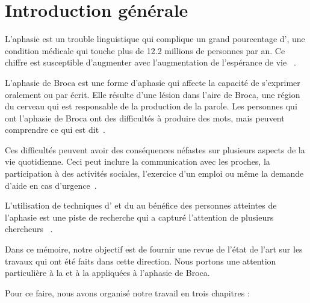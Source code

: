\chapter*{Introduction générale}
\label{chap.intro}

L'aphasie est un trouble linguistique qui complique un grand pourcentage d',
une condition médicale qui touche plus de 12.2 millions de personnes par an.
Ce chiffre est susceptible d'augmenter avec l'augmentation de l'espérance de vie%
~\cite{Feigin_Brainin_Norrving_Martins_Sacco_Hacke_Fisher_Pandian_Lindsay_2022}.

L'aphasie de Broca est une forme d'aphasie qui affecte la capacité de s'exprimer oralement ou par écrit.
Elle résulte d'une lésion dans l'aire de Broca,
une région du cerveau qui est responsable de la production de la parole.
Les personnes qui ont l'aphasie de Broca ont des difficultés à produire des mots,
mais peuvent comprendre ce qui est dit~\cite{Chapey_2008}.

Ces difficultés peuvent avoir des conséquences néfastes sur plusieurs aspects de la vie quotidienne.
Ceci peut inclure la communication avec les proches,
la participation à des activités sociales,
l'exercice d'un emploi
ou même la demande d'aide en cas d'urgence~\cite{Hallowell_2017}.

L'utilisation de techniques d' et du  
au bénéfice des personnes atteintes de l'aphasie est une piste de recherche  
qui a capturé l'attention de plusieurs chercheurs%
~\cite{Smaili_Langlois_Pribil_2022,Qin_Lee_Kong_Lin_2022,Misra_Mishra_Gandhi_2022}.

Dans ce mémoire, notre objectif est de fournir une revue de l'état de l'art
sur les travaux qui ont été faits dans cette direction.
Nous portons une attention particulière à la  et à la 
appliquées à l'aphasie de Broca.

Pour ce faire, nous avons organisé notre travail en trois chapitres :

